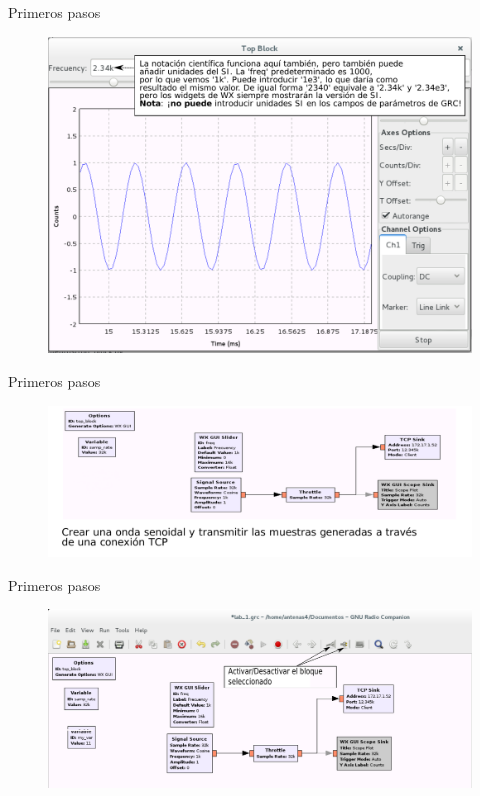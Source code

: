 \begin{frame}{Primeros pasos}
\begin{figure}[H]
\centering
\includegraphics[width=\textwidth, height=0.55\textwidth]{lab1/pdf/lab120.pdf}
\end{figure}
\end{frame}

\begin{frame}{Primeros pasos}
\begin{figure}[H]
\centering
\includegraphics[width=\textwidth]{lab1/pdf/lab121.pdf}
\end{figure}
\end{frame}

\begin{frame}{Primeros pasos}
\begin{figure}[H]
\centering
\includegraphics[width=\textwidth]{lab1/pdf/lab122.pdf}
\end{figure}
\end{frame}

